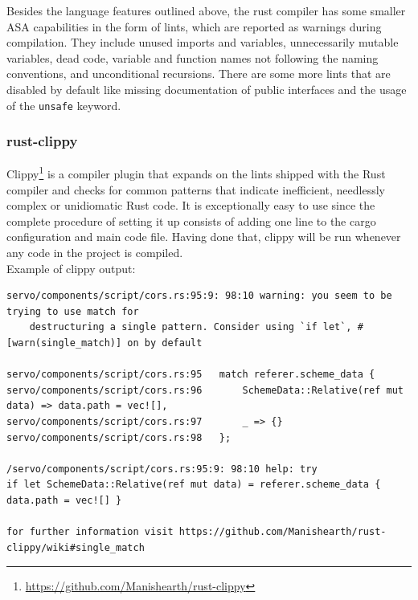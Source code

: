 \documentclass{scrartcl}
\begin{document}
Besides the language features outlined above, the rust compiler has some smaller ASA capabilities in the form of lints, which are reported as warnings during compilation. They include unused imports and variables, unnecessarily mutable variables, dead code, variable and function names not following the naming conventions, and unconditional recursions. There are some more lints that are disabled by default like missing documentation of public interfaces and the usage of the \texttt{unsafe} keyword.

\subsubsection{rust-clippy} \label{clippy}

Clippy\footnote{\url{https://github.com/Manishearth/rust-clippy}} is a compiler plugin that expands on the lints shipped with the Rust compiler and checks for common patterns that indicate inefficient, needlessly complex or unidiomatic Rust code. It is exceptionally easy to use since the complete procedure of setting it up consists of adding one line to the cargo configuration and main code file. Having done that, clippy will be run whenever any code in the project is compiled.\\
\newpage
Example of clippy output:
{
\scriptsize
\begin{verbatim}
servo/components/script/cors.rs:95:9: 98:10 warning: you seem to be trying to use match for
    destructuring a single pattern. Consider using `if let`, #[warn(single_match)] on by default
    
servo/components/script/cors.rs:95   match referer.scheme_data {
servo/components/script/cors.rs:96       SchemeData::Relative(ref mut data) => data.path = vec![],
servo/components/script/cors.rs:97       _ => {}
servo/components/script/cors.rs:98   };

/servo/components/script/cors.rs:95:9: 98:10 help: try
if let SchemeData::Relative(ref mut data) = referer.scheme_data { data.path = vec![] }

for further information visit https://github.com/Manishearth/rust-clippy/wiki#single_match
\end{verbatim}
}
\end{document}
